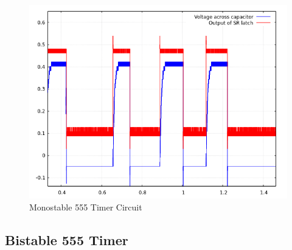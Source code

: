 \documentclass[12pt]{article}
\begin{document}
\begin{FlushLeft}
\begin{figure}[hb]
  \begin{center}
    \includegraphics[width=0.9\linewidth]{../modules/clock/monostable_scope.png}
    \caption{Monostable 555 Timer Circuit}
    \label{fig:monostable_scope}
  \end{center}
\end{figure}


\subsection{Bistable 555 Timer}



\end{FlushLeft}

\clearpage
\end{document}
